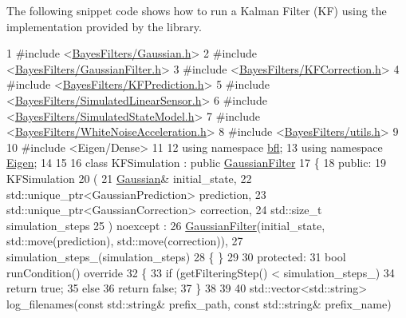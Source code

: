 The following snippet code shows how to run a Kalman Filter (KF) using the implementation provided by the library.~\newline



\begin{DoxyCodeInclude}
1 \textcolor{preprocessor}{#include <\mbox{\hyperlink{Gaussian_8h}{BayesFilters/Gaussian.h}}>}
2 \textcolor{preprocessor}{#include <\mbox{\hyperlink{GaussianFilter_8h}{BayesFilters/GaussianFilter.h}}>}
3 \textcolor{preprocessor}{#include <\mbox{\hyperlink{KFCorrection_8h}{BayesFilters/KFCorrection.h}}>}
4 \textcolor{preprocessor}{#include <\mbox{\hyperlink{KFPrediction_8h}{BayesFilters/KFPrediction.h}}>}
5 \textcolor{preprocessor}{#include <\mbox{\hyperlink{SimulatedLinearSensor_8h}{BayesFilters/SimulatedLinearSensor.h}}>}
6 \textcolor{preprocessor}{#include <\mbox{\hyperlink{SimulatedStateModel_8h}{BayesFilters/SimulatedStateModel.h}}>}
7 \textcolor{preprocessor}{#include <\mbox{\hyperlink{WhiteNoiseAcceleration_8h}{BayesFilters/WhiteNoiseAcceleration.h}}>}
8 \textcolor{preprocessor}{#include <\mbox{\hyperlink{utils_8h}{BayesFilters/utils.h}}>}
9 
10 \textcolor{preprocessor}{#include <Eigen/Dense>}
11 
12 \textcolor{keyword}{using namespace }\mbox{\hyperlink{namespacebfl}{bfl}};
13 \textcolor{keyword}{using namespace }\mbox{\hyperlink{namespaceEigen}{Eigen}};
14 
15 
16 \textcolor{keyword}{class }KFSimulation : \textcolor{keyword}{public} \mbox{\hyperlink{classbfl_1_1GaussianFilter}{GaussianFilter}}
17 \{
18 \textcolor{keyword}{public}:
19     KFSimulation
20     (
21         \mbox{\hyperlink{classbfl_1_1Gaussian}{Gaussian}}& initial\_state,
22         std::unique\_ptr<GaussianPrediction> prediction,
23         std::unique\_ptr<GaussianCorrection> correction,
24         std::size\_t simulation\_steps
25     ) noexcept :
26         \mbox{\hyperlink{classbfl_1_1GaussianFilter}{GaussianFilter}}(initial\_state, std::move(prediction), std::move(correction)),
27         simulation\_steps\_(simulation\_steps)
28     \{ \}
29 
30 \textcolor{keyword}{protected}:
31     \textcolor{keywordtype}{bool} runCondition()\textcolor{keyword}{ override}
32 \textcolor{keyword}{    }\{
33         \textcolor{keywordflow}{if} (getFilteringStep() < simulation\_steps\_)
34             \textcolor{keywordflow}{return} \textcolor{keyword}{true};
35         \textcolor{keywordflow}{else}
36             \textcolor{keywordflow}{return} \textcolor{keyword}{false};
37     \}
38 
39 
40     std::vector<std::string> log\_filenames(\textcolor{keyword}{const} std::string& prefix\_path, \textcolor{keyword}{const} std::string& prefix\_name)\textcolor{keyword}{
}
\end{DoxyCodeInclude}
